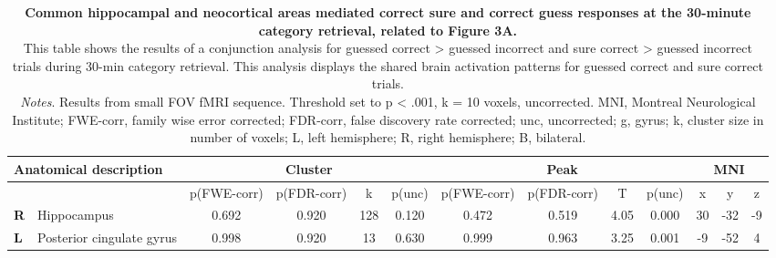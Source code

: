 \begin{landscape}
\begin{table}[!ht]
    \vspace*{-4cm}
    \raggedright
        \begin{tabular}{ll|cccc|cccc|ccc} \\ \hline
        \multicolumn{2}{l}{\textbf{Anatomical description}} & \multicolumn{4}{c}{\textbf{Cluster}} & \multicolumn{4}{c}{\textbf{Peak}} &  \multicolumn{3}{c}{\textbf{MNI}} \\ \hline
        \multicolumn{2}{l}{\textbf{}} & \multicolumn{1}{l}{p(FWE-corr)} & p(FDR-corr) & k & \multicolumn{1}{l}{p(unc)} & p(FWE-corr) & p(FDR-corr) & T & \multicolumn{1}{l}{p(unc)} & x & y & z \\ \hline
        \textbf{R} & Hippocampus & 0.692 & 0.920 & 128 & 0.120 & 0.472 & 0.519 & 4.05 & 0.000 & 30 & -32 & -9 \\
        \textbf{L} & Posterior cingulate gyrus & 0.998 & 0.920 & 13 & 0.630 & 0.999 & 0.963 & 3.25 & 0.001 & -9 & -52 & 4 \\ \hline
    \end{tabular}
    \vspace{1.0 em}
    \caption{\textbf{Common hippocampal and neocortical areas mediated correct sure and correct guess responses at the 30-minute category retrieval, related to Figure 3A.} \\ 
    This table shows the results of a conjunction analysis for guessed correct > guessed incorrect and sure correct > guessed incorrect trials during 30-min category retrieval. 
    This analysis displays the shared brain activation patterns for guessed correct and sure correct trials. \\ 
    \vspace{1.0 em} \textit{Notes}. Results from small FOV fMRI sequence. Threshold set to p < .001, k = 10 voxels, uncorrected. MNI, Montreal Neurological Institute; FWE-corr, family wise error corrected; FDR-corr, false discovery rate corrected; unc, uncorrected; g, gyrus; k, cluster size in number of voxels; L, left hemisphere; R, right hemisphere; B, bilateral.}
    \label{tab:Retrieval1_hipp_Conjunction_ConsciousUnconscious}
\end{table}
\end{landscape}

